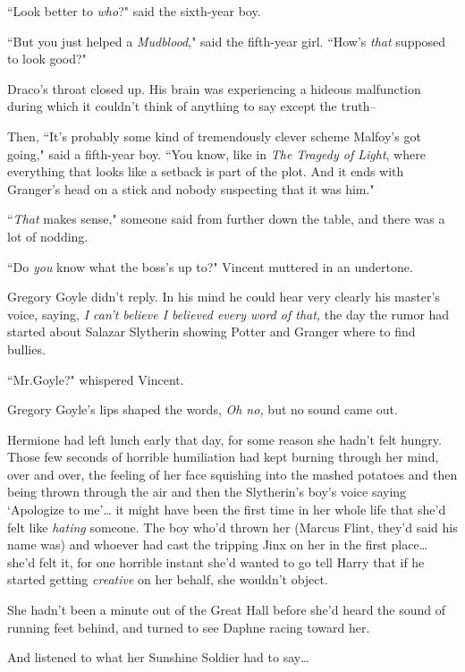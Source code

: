 ``Look better to \emph{who}?" said the sixth-year boy.

``But you just helped a \emph{Mudblood}," said the fifth-year girl. ``How's \emph{that} supposed to look good?"

Draco's throat closed up. His brain was experiencing a hideous malfunction during which it couldn't think of anything to say except the truth\---

Then, ``It's probably some kind of tremendously clever scheme Malfoy's got going," said a fifth-year boy. ``You know, like in \emph{The Tragedy of Light}, where everything that looks like a setback is part of the plot. And it ends with Granger's head on a stick and nobody suspecting that it was him."

``\emph{That} makes sense," someone said from further down the table, and there was a lot of nodding.

\later

``Do \emph{you} know what the boss's up to?" Vincent muttered in an undertone.

Gregory Goyle didn't reply. In his mind he could hear very clearly his master's voice, saying, \emph{I can't believe I believed every word of that,} the day the rumor had started about Salazar Slytherin showing Potter and Granger where to find bullies.

``Mr.\?Goyle?" whispered Vincent.

Gregory Goyle's lips shaped the words, \emph{Oh no,} but no sound came out.

\later

Hermione had left lunch early that day, for some reason she hadn't felt hungry. Those few seconds of horrible humiliation had kept burning through her mind, over and over, the feeling of her face squishing into the mashed potatoes and then being thrown through the air and then the Slytherin's boy's voice saying `Apologize to me'{\ldots} it might have been the first time in her whole life that she'd felt like \emph{hating} someone. The boy who'd thrown her (Marcus Flint, they'd said his name was) and whoever had cast the tripping Jinx on her in the first place{\ldots} she'd felt it, for one horrible instant she'd wanted to go tell Harry that if he started getting \emph{creative} on her behalf, she wouldn't object.

She hadn't been a minute out of the Great Hall before she'd heard the sound of running feet behind, and turned to see Daphne racing toward her.

And listened to what her Sunshine Soldier had to say{\ldots}

